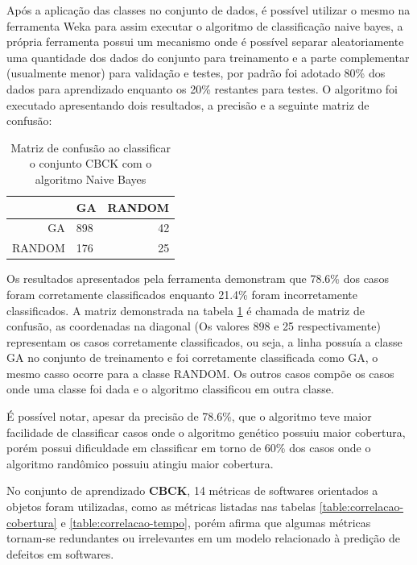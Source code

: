 \documentclass[
	12pt,				%
	oneside,			%
	a4paper,			%
	english,			%
	brazil				%
	]{abntex2ppgsi}
\begin{document}
Após a aplicação das classes no conjunto de dados, é possível utilizar o mesmo na ferramenta Weka para assim executar o algoritmo de classificação naive bayes, a própria ferramenta possui um mecanismo onde é possível separar aleatoriamente uma quantidade dos dados do conjunto para treinamento e a parte complementar (usualmente menor) para validação e testes, por padrão foi adotado 80\% dos dados para aprendizado enquanto os 20\% restantes para testes. O algoritmo foi executado apresentando dois resultados, a precisão e a seguinte matriz de confusão:

\begin{table}[h]
\centering
\caption{Matriz de confusão ao classificar o conjunto CBCK com o algoritmo Naive Bayes}
\vspace{0.5cm}
\begin{tabular}{r|lr}

										
 & GA & RANDOM \\ %
\hline                               %
GA		& 898		& 42 \\
RANDOM		& 176		& 25
\end{tabular}
\label{table:confusao-CBCK}
\end{table}

Os resultados apresentados pela ferramenta demonstram que 78.6\% dos casos foram corretamente classificados enquanto 21.4\% foram incorretamente classificados. A matriz demonstrada na tabela \ref{table:confusao-CBCK} é chamada de matriz de confusão, as coordenadas na diagonal (Os valores 898 e 25 respectivamente) representam os casos corretamente classificados, ou seja, a linha possuía a classe GA no conjunto de treinamento e foi corretamente classificada como GA, o mesmo casso ocorre para a classe RANDOM. Os outros casos compõe os casos onde uma classe foi dada e o algoritmo classificou em outra classe.

É possível notar, apesar da precisão de 78.6\%, que o algoritmo teve maior facilidade de classificar casos onde o algoritmo genético possuiu maior cobertura, porém possui dificuldade em classificar em torno de 60\% dos casos onde o algoritmo randômico possuiu atingiu maior cobertura.

No conjunto de aprendizado \textbf{CBCK}, 14 métricas de softwares orientados a objetos foram utilizadas, como as métricas listadas nas tabelas  \ref{table:correlacao-cobertura} e \ref{table:correlacao-tempo}, porém \cite{Xia2013} afirma que algumas métricas tornam-se redundantes ou irrelevantes em um modelo relacionado à predição de defeitos em softwares.
\end{document}
